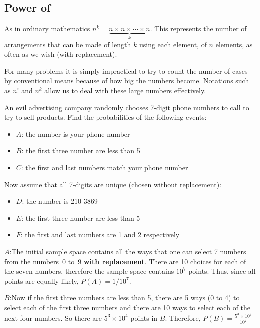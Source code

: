 \subsection*{Power of}
As in ordinary mathematics $n^k = \underbrace{n \times n \times \cdots \times n}_k$. This represents the number of arrangements that can be made of length $k$ using each element, of $n$ elements, as often as we wish (with replacement).
\begin{info}
For many problems it is simply impractical to try to count the number of cases by conventional means because of how big the numbers become. Notations such as $n!$ and $n^k$ allow us to deal with these large numbers effectively.
\end{info}
\begin{example}
An evil advertising company randomly chooses 7-digit phone numbers to call to try to sell products. Find the probabilities of the following events:
\begin{itemize}[noitemsep, topsep=4pt plus 2pt minus 1pt]
    \item $A$: the number is your phone number
    \item $B$: the first three number are less than 5
    \item $C$: the first and last numbers match your phone number
\end{itemize}
Now assume that all 7-digits are unique (chosen without replacement):
\begin{itemize}[noitemsep, topsep=4pt plus 2pt minus 1pt]
    \item $D$: the number is 210-3869
    \item $E$: the first three number are less than 5
    \item $F$: the first and last numbers are 1 and 2 respectively
\end{itemize}
\tcblower
$A$:\hspace{5mm}The initial sample space contains all the ways that one can select 7 numbers from the numbers~0 to~9 \textbf{with replacement}. There are 10 choices for each of the seven numbers, therefore the sample space contains $10^7$ points. Thus, since all points are equally likely, $P(A) = 1/10^7$.
\par\smallskip
$B$:\hspace{5mm}Now if the first three numbers are less than 5, there are 5 ways (0 to 4) to select each of the first three numbers and there are 10 ways to select each of the next four numbers. So there are $5^3 \times 10^4$ points in $B$. Therefore, $P(B) = \frac{5^3 \times 10^4}{10^7}$

\end{example}
